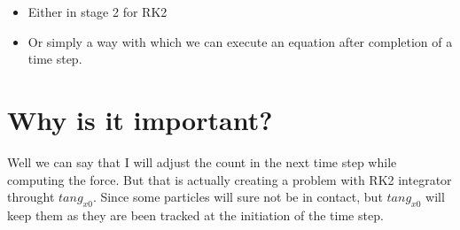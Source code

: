 \begin{itemize}
\item Either in stage 2 for RK2
\item Or simply a way with which we can execute an equation after completion of a
time step.
\end{itemize}



\section{Why is it important?}
\label{sec-6}
Well we can say that I will adjust the count in the next time step while
computing the force. But that is actually creating a problem with RK2
integrator throught $tang_{x0}$. Since some particles will sure not be in
contact, but $tang_{x0}$ will keep them as they are been tracked at the
initiation of the time step.
